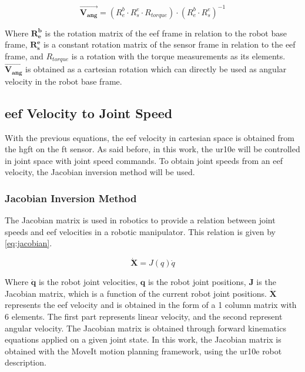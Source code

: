 \begin{equation}
    \vec{\mathbf{V_{ang}}} = (R^b_e \cdot R^e_s \cdot R_{torque}) \cdot (R^b_e \cdot R^e_s)^{-1}
    \label{eq:torque_to_angular_vel}
\end{equation}

\noindent Where $\mathbf{R^b_e}$ is the rotation matrix of the \ac{eef} frame in relation to the robot base frame, $\mathbf{R^e_s}$ is a constant rotation matrix of the sensor frame in relation to the \ac{eef} frame, and $R_{torque}$ is a rotation with the torque measurements as its elements. $\vec{\mathbf{V_{ang}}}$ is obtained as a cartesian rotation which can directly be used as angular velocity in the robot base frame.



\subsection{\ac{eef} Velocity to Joint Speed}
\label{ssec:eef_to_js}

\par With the previous equations, the \ac{eef} velocity in cartesian space is obtained from the \ac{hgft} on the \ac{ft} sensor. As said before, in this work, the \ac{ur10e} will be controlled in joint space with joint speed commands. To obtain joint speeds from an \ac{eef} velocity, the Jacobian inversion method will be used.


\subsubsection{Jacobian Inversion Method}


\par The Jacobian matrix is used in robotics to provide a relation between joint speeds and \ac{eef} velocities in a robotic manipulator. This relation is given by \autoref{eq:jacobian}.

\begin{equation}
    \dot{\mathbf{X}} = J(q)\dot{q}
    \label{eq:jacobian}
\end{equation}

\noindent Where $\dot{\mathbf{q}}$ is the robot joint velocities, $\mathbf{q}$ is the robot joint positions, $\mathbf{J}$ is the Jacobian matrix, which is a function of the current robot joint positions. $\dot{\mathbf{X}}$ represents the \ac{eef} velocity and is obtained in the form of a 1 column matrix with 6 elements. The first part represents linear velocity, and the second represent angular velocity. The Jacobian matrix is obtained through forward kinematics equations applied on a given joint state. In this work, the Jacobian matrix is obtained with the MoveIt motion planning framework, using the \ac{ur10e} robot description. 

